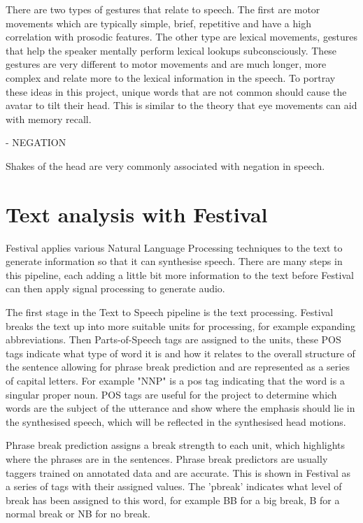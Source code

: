 \documentclass[bsc,frontabs,twoside,singlespacing,parskip]{infthesis}
\begin{document}
There are two types of gestures that relate to speech. \cite{lexical_gestures} The first are motor movements which are typically simple, brief, repetitive and have a high correlation with prosodic features. The other type are lexical movements, gestures that help the speaker mentally perform lexical lookups subconsciously. These gestures are very different to motor movements and are much longer, more complex and relate more to the lexical information in the speech. To portray these ideas in this project, unique words that are not common should cause the avatar to tilt their head. This is similar to the theory that eye movements can aid with memory recall. \cite{eye_movements}

- NEGATION \cite{negative_sentiment}

Shakes of the head are very commonly associated with negation in speech.

\section{Text analysis with Festival}

Festival applies various Natural Language Processing techniques to the text to generate information  so that it can synthesise speech.  There are many steps in this pipeline, each adding a little bit more information to the text before Festival can then apply signal processing to generate audio. 

The first stage in the Text to Speech pipeline is the text processing. Festival breaks the text up into more suitable units for processing, for example expanding abbreviations. Then Parts-of-Speech tags are assigned to the units, these POS tags indicate what type of word it is and how it relates to the overall structure of the sentence allowing for phrase break prediction and are represented as a series of capital letters. For example "NNP" is a pos tag indicating that the word is a singular proper noun. POS tags are useful for the project to determine which words are the subject of the utterance and show where the emphasis should lie in the synthesised speech, which will be reflected in the synthesised head motions.

Phrase break prediction assigns a break strength to each unit, which highlights where the phrases are in the sentences. Phrase break predictors are usually taggers trained on annotated data and are accurate. This is shown in Festival as a series of tags with their assigned values. The 'pbreak' indicates what level of break has been assigned to this word, for example BB for a big break, B for a normal break or NB for no break.
\end{document}
